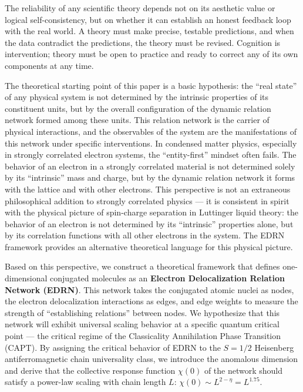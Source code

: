 \documentclass[prb,reprint,twocolumn,superscriptaddress]{revtex4-2}
\begin{document}
The reliability of any scientific theory depends not on its aesthetic value or logical self-consistency, but on whether it can establish an honest feedback loop with the real world. A theory must make precise, testable predictions, and when the data contradict the predictions, the theory must be revised. Cognition is intervention; theory must be open to practice and ready to correct any of its own components at any time.

The theoretical starting point of this paper is a basic hypothesis: the ``real state'' of any physical system is not determined by the intrinsic properties of its constituent units, but by the overall configuration of the dynamic relation network formed among these units. This relation network is the carrier of physical interactions, and the observables of the system are the manifestations of this network under specific interventions. In condensed matter physics, especially in strongly correlated electron systems, the ``entity-first'' mindset often fails. The behavior of an electron in a strongly correlated material is not determined solely by its ``intrinsic'' mass and charge, but by the dynamic relation network it forms with the lattice and with other electrons. This perspective is not an extraneous philosophical addition to strongly correlated physics --- it is consistent in spirit with the physical picture of spin-charge separation in Luttinger liquid theory: the behavior of an electron is not determined by its ``intrinsic'' properties alone, but by its correlation functions with all other electrons in the system. The EDRN framework provides an alternative theoretical language for this physical picture.

Based on this perspective, we construct a theoretical framework that defines one-dimensional conjugated molecules as an \textbf{Electron Delocalization Relation Network (EDRN)}. This network takes the conjugated atomic nuclei as nodes, the electron delocalization interactions as edges, and edge weights to measure the strength of ``establishing relations'' between nodes. We hypothesize that this network will exhibit universal scaling behavior at a specific quantum critical point --- the critical regime of the Classicality Annihilation Phase Transition (CAPT). By assigning the critical behavior of EDRN to the $S = 1/2$ Heisenberg antiferromagnetic chain universality class, we introduce the anomalous dimension and derive that the collective response function $\chi(0)$ of the network should satisfy a power-law scaling with chain length $L$: $\chi(0) \sim L^{2-\eta} = L^{1.75}$.
\end{document}
